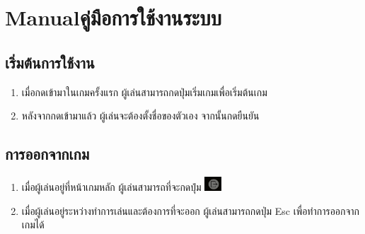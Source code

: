 









\chapter{\ifenglish Manual\else คู่มือการใช้งานระบบ\fi}

\section*{เริ่มต้นการใช้งาน}
\begin{enumerate}
    \item เมื่อกดเข้ามาในเกมครั้งแรก ผู้เล่นสามารถกดปุ่มเริ่มเกมเพื่อเริ่มต้นเกม
    \item หลังจากกดเข้ามาแล้ว ผู้เล่นจะต้องตั้งชื่อของตัวเอง จากนั้นกดยืนยัน
\end{enumerate}

\section*{การออกจากเกม}
\begin{enumerate}
    \item เมื่อผู้เล่นอยู่ที่หน้าเกมหลัก ผู้เล่นสามารถที่จะกดปุ่ม \includegraphics[width=0.05\textwidth, height=0.03\textheight]{Images/ExitBtn.png}
    \item เมื่อผู้เล่นอยู่ระหว่างทำการเล่นและต้องการที่จะออก ผู้เล่นสามารถกดปุ่ม Esc เพื่อทำการออกจากเกมได้
\end{enumerate}

